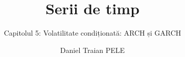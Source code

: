 \title[Serii de timp]{Serii de timp}
\subtitle{Capitolul 5: Volatilitate condiționată: ARCH și GARCH}
\author[D.T. Pele]{Daniel Traian PELE}
\date{}

\providecommand{\tsaapplink}[3]{\hypertarget{#2}{}\hyperlink{#1}{\beamergotobutton{#3}}}  %
\providecommand{\tsaappback}[2]{\begin{tikzpicture}[remember picture,overlay]\node[anchor=south east] at ([xshift=-3mm,yshift=7mm]current page.south east){\hyperlink{#1}{\beamerreturnbutton{#2}}};\end{tikzpicture}}  %
\providecommand{\tsachlink}[2]{\href{#1}{#2}}  %
\providecommand{\tsachlinkt}[2]{\href{#1}{\usebeamercolor[fg]{frametitle}#2}}  %


